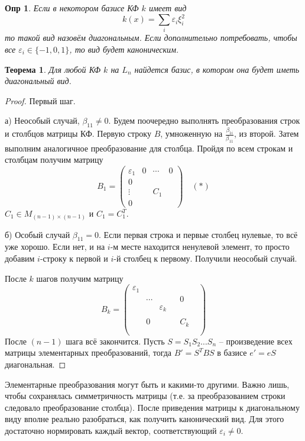 \documentclass[a4paper,12pt]{article}
\newtheorem*{definition}{Опр}
\newtheorem{theorem}{Теорема}[section]
\begin{document}
\begin{definition}
	Если в некотором базисе КФ $k$ имеет вид 
	\[
		k(x) = \sum_{i} \varepsilon_i \xi_i^2
	\]
	то такой вид назовём диагональным. Если дополнительно потребовать, чтобы все $\varepsilon_i \in \{-1, 0, 1\}$, то вид будет каноническим.
\end{definition}

\begin{theorem}
	Для любой КФ $k$ на $L_n$ найдется базис, в котором она будет иметь диагональный вид.
\end{theorem}
\begin{proof}
	Первый шаг.
	
	а) Неособый случай, $\beta_{11} \ne 0$. Будем поочередно выполнять преобразования строк и столбцов матрицы КФ.  Первую строку $B$, умноженную на $\frac{\beta_{1i}}{\beta_{11}}$, из второй. Затем выполним аналогичное преобразование для столбца. Пройдя по всем строкам и столбцам получим матрицу
	\[
		B_1 = \begin{pmatrix}
			\varepsilon_1 & 0 & \cdots & 0 \\
			0 &  &  &  \\
			\vdots &  & C_1  &  \\
			0 &  &  &  
		\end{pmatrix} \quad (*)
	\]
	$C_1 \in M_{(n-1) \times (n-1)}$ и $C_1 = C_1^T$.
	
	б) Особый случай $\beta_{11} = 0$. Если первая строка и первые столбец нулевые, то всё уже хорошо. Если нет, и на $i$-м месте находится ненулевой элемент, то просто добавим $i$-строку к первой и $i$-й столбец к первому. Получили неособый случай.
	
	После $k$ шагов получим матрицу
	\[
		B_k = \begin{pmatrix}
			\varepsilon_1 &    &  & & \\
			  & \cdots &   &   &  0 &     \\
			 & & \varepsilon_k  & & & \\
			 & & & & & \\
 			 &0 & & & C_k & \\
 			 & & & & & \\
		\end{pmatrix}
	\]
	После $(n-1)$ шага всё закончится. Пусть $S = S_1 S_2 \ldots S_n$ -- произведение всех матрицы элементарных преобразований, тогда $B' = S^T B S$ в базисе $e' = eS$ диагональная.
\end{proof}

Элементарные преобразования могут быть и какими-то другими. Важно лишь, чтобы сохранялась симметричность матрицы (т.е. за преобразованием строки следовало преобразование столбца). После приведения матрицы к диагональному виду вполне реально разобраться, как получить канонический вид. Для этого достаточно нормировать каждый вектор, соответствующий $ \varepsilon_i \ne 0$.
\end{document}
